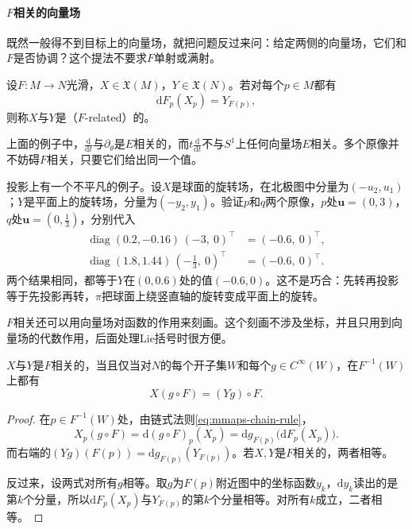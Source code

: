\paragraph{$F$相关的向量场}
既然一般得不到目标上的向量场，就把问题反过来问：给定两侧的向量场，它们和$F$是否协调？这个提法不要求$F$单射或满射。

\begin{definition}[$F$相关]
\label{def:mmaps-f-related}
设$F:M\to N$光滑，$X\in\mathfrak X(M)$，$Y\in\mathfrak X(N)$。若对每个$p\in M$都有
\begin{equation}
\mathrm dF_p(X_p)=Y_{F(p)},
\label{eq:mmaps-f-related}
\end{equation}
则称$X$与$Y$是（$F$-related）的。
\end{definition}

上面的例子中，$\frac{\mathrm d}{\mathrm dt}$与$\partial_\theta$是$E$相关的，而$t\frac{\mathrm d}{\mathrm dt}$不与$S^1$上任何向量场$E$相关。多个原像并不妨碍$F$相关，只要它们给出同一个值。

投影上有一个不平凡的例子。设$X$是球面的旋转场，在北极图中分量为$(-u_2,u_1)$；$Y$是平面上的旋转场，分量为$(-y_2,y_1)$。验证$p$和$q$两个原像，$p$处$\bm u=(0,3)$，$q$处$\bm u=(0,\tfrac13)$，分别代入
\[
\begin{aligned}
\operatorname{diag}(0.2,-0.16)\,(-3,\ 0)^\top&=(-0.6,\ 0)^\top,\\
\operatorname{diag}(1.8,1.44)\,(-\tfrac13,\ 0)^\top&=(-0.6,\ 0)^\top .
\end{aligned}
\]
两个结果相同，都等于$Y$在$(0,0.6)$处的值$(-0.6,0)$。这不是巧合：先转再投影等于先投影再转，$\pi$把球面上绕竖直轴的旋转变成平面上的旋转。

$F$相关还可以用向量场对函数的作用来刻画。这个刻画不涉及坐标，并且只用到向量场的代数作用，后面处理Lie括号时很方便。

\begin{lemma}[$F$相关的函数刻画]
\label{lem:mmaps-f-related-functions}
$X$与$Y$是$F$相关的，当且仅当对$N$的每个开子集$W$和每个$g\in C^\infty(W)$，在$F^{-1}(W)$上都有
\begin{equation}
X(g\circ F)=(Yg)\circ F .
\label{eq:mmaps-f-related-functions}
\end{equation}
\end{lemma}

\begin{proof}
在$p\in F^{-1}(W)$处，由链式法则\eqref{eq:mmaps-chain-rule}，
\[
X_p(g\circ F)=\mathrm d(g\circ F)_p(X_p)=\mathrm dg_{F(p)}\bigl(\mathrm dF_p(X_p)\bigr).
\]
而右端的$(Yg)(F(p))=\mathrm dg_{F(p)}(Y_{F(p)})$。若$X,Y$是$F$相关的，两者相等。

反过来，设两式对所有$g$相等。取$g$为$F(p)$附近图中的坐标函数$y_k$，$\mathrm dy_k$读出的是第$k$个分量，所以$\mathrm dF_p(X_p)$与$Y_{F(p)}$的第$k$个分量相等。对所有$k$成立，二者相等。
\end{proof}

